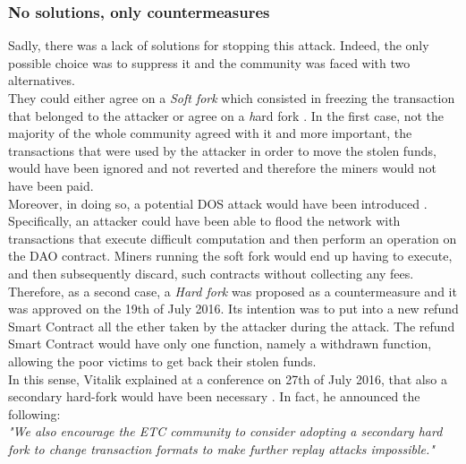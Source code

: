 \subsubsection{No solutions, only countermeasures}
Sadly, there was a lack of solutions for stopping this attack. Indeed, the only possible choice was to suppress it and the community was faced with two alternatives.
\\They could either agree on a \textit{Soft fork} which consisted in freezing the transaction that belonged to the attacker or agree on a {\textit hard fork} . In the first case, not the majority of the whole community agreed with it and more important, the transactions that were used by the attacker in order to move the stolen funds, would have been ignored and not reverted and therefore the miners would not have been paid.
\\Moreover, in doing so, a potential DOS attack would have been introduced \cite{ok}. 
Specifically, an attacker could have been able to flood the network with transactions that execute difficult computation and then perform an operation on the DAO contract. Miners running the soft fork would end up having to execute, and then subsequently discard, such contracts without collecting any fees.
\\Therefore, as a second case, a \textit{Hard fork} was proposed as a countermeasure and it was approved on the 19th of July 2016. Its intention was to put into a new refund Smart Contract all the ether taken by the attacker during the attack. The refund Smart Contract would have only one function, namely a withdrawn function, allowing the poor victims to get back their stolen funds. \\



In this sense, Vitalik explained at a conference on 27th of July 2016, that also a secondary hard-fork would have been necessary \cite{vit}. In fact, he announced the following: \\ 


\textit{"We also encourage the ETC community to consider adopting a secondary hard fork to change transaction formats to make further replay attacks impossible."} 



